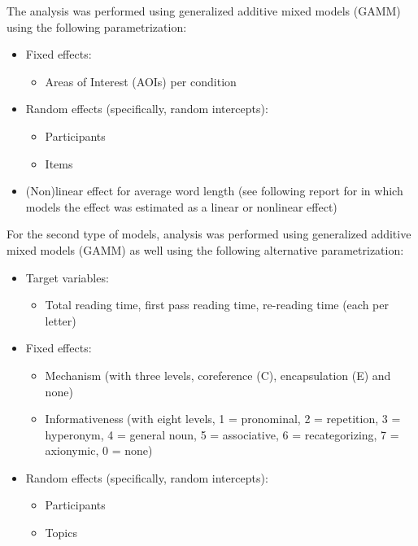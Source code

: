 The analysis was performed using generalized additive mixed models (GAMM) using the following parametrization:

\begin{itemize}
  \item Fixed effects:
  \begin{itemize}
    \item Areas of Interest (AOIs) per condition
  \end{itemize}
  \item  Random effects (specifically, random intercepts):
  \begin{itemize}
    \item Participants
    \item Items
  \end{itemize}
  \item (Non)linear effect for average word length (see following report for in which models the effect was estimated as a linear or nonlinear effect)
\end{itemize}

For the second type of models, analysis was performed using generalized additive mixed models (GAMM) as well using the following alternative parametrization:

\begin{itemize}
  \item Target variables:
  \begin{itemize}
    \item Total reading time, first pass reading time, re-reading time (each per letter)
  \end{itemize}
  \item Fixed effects:
  \begin{itemize}
    \item Mechanism (with three levels, coreference (C), encapsulation (E) and none)
    \item Informativeness (with eight levels, 1 = pronominal, 2 = repetition, 3 = hyperonym, 4 = general noun, 5 = associative, 6 = recategorizing, 7 = axionymic, 0 = none)
  \end{itemize}
  \item  Random effects (specifically, random intercepts):
  \begin{itemize}
    \item Participants
    \item Topics
  \end{itemize}
\end{itemize}


